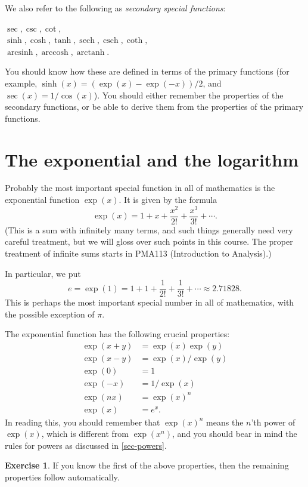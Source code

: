 \documentclass[a4paper]{book}
\newcommand{\PURPLE}[1]{{\color{purple}#1}}
\newcommand{\csch}     {\operatorname{csch}}
\newcommand{\sech}     {\operatorname{sech}}
\newcommand{\arcsinh}  {\operatorname{arcsinh}}
\newcommand{\arccosh}  {\operatorname{arccosh}}
\newcommand{\arctanh}  {\operatorname{arctanh}}
\renewcommand{\:}{\colon}
\newcommand{\PMA}[1]{PMA#1}
\newcommand{\DEFN}[1]{\PURPLE{\emph{#1}}}
\theoremstyle{definition}
\newtheorem{exercise}[theorem]{Exercise}
\begin{document}
We also refer to the following as \DEFN{secondary special functions}:
\begin{center}
  $\sec, \csc, \cot,$\\
  $\sinh, \cosh, \tanh, \sech, \csch, \coth,$ \\
  $\arcsinh, \arccosh, \arctanh.$
\end{center}
You should know how these are defined in terms of the primary
functions (for example, $\sinh(x)=(\exp(x)-\exp(-x))/2$, and
$\sec(x)=1/\cos(x)$).  You should either remember the properties of
the secondary functions, or be able to derive them from the properties
of the primary functions.

\section{The exponential and the logarithm}
\label{sec-explog}

Probably the most important special function in all of mathematics is
the exponential function $\exp(x)$.  It is given by the formula
\[ \exp(x) = 1 + x + \frac{x^2}{2!} + \frac{x^3}{3!} + \cdots. \]
(This is a sum with infinitely many terms, and such things generally
need very careful treatment, but we will gloss over such points
in this course.  The proper treatment of infinite sums starts in
\PMA{113} (Introduction to Analysis).)

In particular, we put
\[ e = \exp(1) = 1 + 1 + \frac{1}{2!} + \frac{1}{3!} + \cdots
    \approx 2.71828.
\]
This is perhaps the most important special number in all of
mathematics, with the possible exception of $\pi$.

The exponential function has the following crucial properties:
\begin{align*}
 \exp(x+y) &= \exp(x) \exp(y) \\
 \exp(x-y) &= \exp(x)/\exp(y) \\
 \exp(0)   &= 1 \\
 \exp(-x)  &= 1/\exp(x) \\
 \exp(nx)  &= \exp(x)^n \\
 \exp(x)   &= e^x.
\end{align*}
In reading this, you should remember that $\exp(x)^n$ means
the $n$'th power of $\exp(x)$, which is different from $\exp(x^n)$,
and you should bear in mind the rules for powers as discussed in
\autoref{sec-powers}.  
\begin{exercise}
 If you know the first of the above properties, then the remaining
 properties follow automatically.
\end{exercise}
\end{document}
